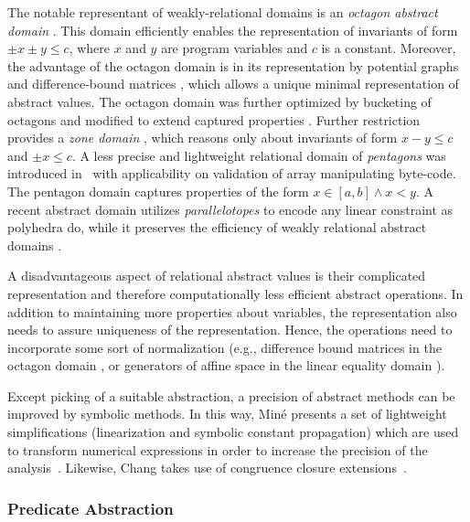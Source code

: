 The notable representant of weakly-relational domains is an \emph{octagon
abstract domain} \cite{Mine2006}. This domain efficiently enables the
representation of invariants of form $\pm x \pm y \leq c$, where $x$ and $y$
are program variables and $c$ is a constant.  Moreover, the advantage of the
octagon domain is in its representation by potential graphs and
difference-bound matrices \cite{Larsen1997}, which allows a unique minimal
representation of abstract values. The octagon domain was further
optimized by bucketing of octagons \cite{Blanchet2003, Venet2004} and modified
to extend captured properties \cite{Claris2004, Mine2004}. Further restriction
provides a \emph{zone domain} \cite{Mine2001}, which reasons only about
invariants of form $x - y \leq c$ and $\pm x \leq c$. A less precise and
lightweight relational domain of \emph{pentagons} was introduced
in~\cite{Logozzo2010} with applicability on validation of array manipulating
byte-code. The pentagon domain captures properties of the form $x \in [a,b]
\wedge x < y$. A recent abstract domain utilizes \emph{parallelotopes} to
encode any linear constraint as polyhedra do, while it preserves the efficiency
of weakly relational abstract domains \cite{Amato2017}.

A disadvantageous aspect of relational abstract values is their complicated
representation and therefore computationally less efficient abstract
operations. In addition to maintaining more properties about variables, the
representation also needs to assure uniqueness of the representation. Hence,
the operations need to incorporate some sort of normalization (e.g., difference
bound matrices in the octagon domain \cite{Mine2006}, or generators of affine
space in the linear equality domain \cite{Karr1976}).

Except picking of a suitable abstraction, a precision of abstract methods can
be improved by symbolic methods. In this way, Miné presents a set of
lightweight simplifications (linearization and symbolic constant propagation)
which are used to transform numerical expressions in order to increase the
precision of the analysis~\cite{Mine2006b}. Likewise, Chang takes use of
congruence closure extensions~\cite{Chang2005}.

\subsubsection{Predicate Abstraction}

